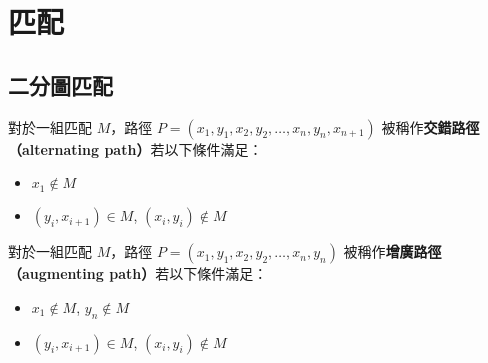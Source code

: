 \documentclass[standalone]{beamer}
\begin{document}
\section{匹配}

\subsection{二分圖匹配}

\begin{frame}{}
   {
    \begin{definition}
      對於一組匹配 $M$，路徑 $P = (x_1, y_1, x_2, y_2, \ldots, x_n, y_n, x_{n + 1})$
      被稱作\textbf{交錯路徑（alternating path）}若以下條件滿足：
      \begin{itemize}
        \item $x_1 \not\in M$
        \item $(y_i, x_{i + 1}) \in M$, $(x_i, y_i) \not\in M$
      \end{itemize}
    \end{definition}
  }
   {
    \begin{definition}
      對於一組匹配 $M$，路徑 $P = (x_1, y_1, x_2, y_2, \ldots, x_n, y_n)$
      被稱作\textbf{增廣路徑（augmenting path）}若以下條件滿足：
      \begin{itemize}
        \item $x_1 \not\in M$, $y_n \not\in M$
        \item $(y_i, x_{i + 1}) \in M$, $(x_i, y_i) \not\in M$
      \end{itemize}
    \end{definition}
  }
\end{frame}
\end{document}
